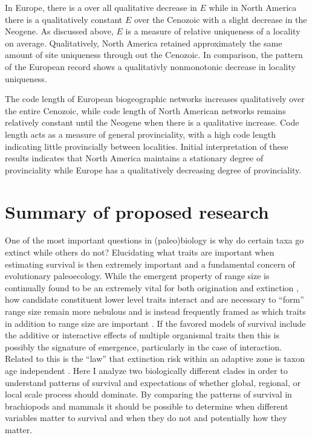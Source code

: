\documentclass[12pt,letterpaper]{article}
\begin{document}
In Europe, there is a over all qualitative decrease in \(E\) while in North America there is a qualitatively constant \(E\) over the Cenozoic with a slight decrease in the Neogene. As discussed above, \(E\) is a measure of relative uniqueness of a locality on average. Qualitatively, North America retained approximately the same amount of site uniqueness through out the Cenozoic. In comparison, the pattern of the European record shows a qualitativly nonmonotonic decrease in locality uniqueness.

The code length of European biogeographic networks increases qualitatively over the entire Cenozoic, while code length of North American networks remains relatively constant until the Neogene when there is a qualitative increase. Code length acts as a measure of general provinciality, with a high code length indicating little provincially between localities. Initial interpretation of these results indicates that North America maintains a stationary degree of provinciality while Europe has a qualitatively decreasing degree of provinciality. 


\section{Summary of proposed research}
One of the most important questions in (paleo)biology is why do certain taxa go extinct while others do not? Elucidating what traits are important when estimating survival is then extremely important and a fundamental concern of evolutionary paleoecology. While the emergent property of range size is continually found to be an extremely vital for both origination and extinction \citep{Roy2009c,Foote2013,Jablonski2003,Jablonski1987,Harnik2013}, how candidate constituent lower level traits interact and are necessary to ``form'' range size remain more nebulous and is instead frequently framed as which traits in addition to range size are important \citep{Foote2013,Harnik2011,Nurnberg2013a}. If the favored models of survival include the additive or interactive effects of multiple organismal traits then this is possibly the signature of emergence, particularly in the case of interaction. Related to this is the ``law'' that extinction risk within an adaptive zone is taxon age independent \citep{VanValen1973}. Here I analyze two biologically different clades in order to understand patterns of survival and expectations of whether global, regional, or local scale process should dominate. By comparing the patterns of survival in brachiopods and mammals it should be possible to determine when different variables matter to survival and when they do not and potentially how they matter.
\end{document}
